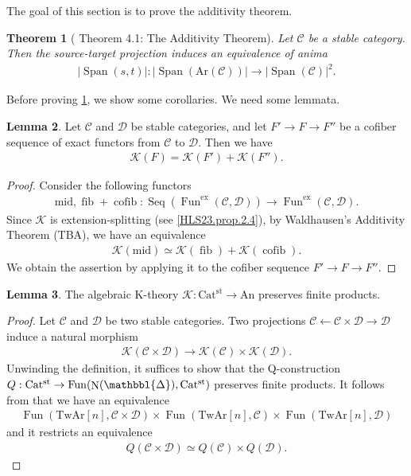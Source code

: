 \documentclass[a4paper,dvipdfmx,11pt,reqno]{amsart}
\DeclareMathOperator{\fib}{fib}
\DeclareMathOperator{\cofib}{cofib}
\renewcommand{\mid}{\mathrm{mid}}
\DeclareMathOperator{\N}{N}
\DeclareMathOperator{\Fun}{Fun}
\newcommand{\C}{\mathcal{C}}
\newcommand{\D}{\mathcal{D}}
\newcommand{\K}{\mathcal{K}}
\DeclareMathOperator{\Seq}{Seq}
\DeclareMathOperator{\Span}{Span}
\newcommand{\An}{\mathrm{An}}
\newcommand{\Catst}{\mathrm{Cat^{st}}}
\newcommand{\Ar}{\mathrm{Ar}}
\newcommand{\TwAr}{\mathrm{TwAr}}
\newcommand{\prism}{{\mathlarger{\mathbbl{\Delta}}}}
\newtheorem{theorem}{Theorem}[section]
\theoremstyle{definition}
\newtheorem{lemma}[theorem]{Lemma}
\begin{document}
The goal of this section is to prove the additivity theorem.

\begin{theorem}[\cite{HLS23} Theorem 4.1: The Additivity Theorem] \label{thrm.additivity_theorem}
  Let $\C$ be a stable category.
  Then the source-target projection induces an equivalence of anima 
  \begin{align*}
    |\Span(s,t)| : |\Span(\Ar(\C))| \to |\Span(\C)|^2.
  \end{align*}
\end{theorem}

Before proving \cref{thrm.additivity_theorem}, we show some corollaries.
We need some lemmata.

\begin{lemma} \label{Ber.cor.5.7}
  Let $\C$ and $\D$ be stable categories, and let $F' \to F \to F''$ be a cofiber sequence of exact functors from $\C$ to $\D$.
  Then we have 
  \begin{align*}
    \K(F) 
    = \K(F') + \K(F'').
  \end{align*}
\end{lemma}

\begin{proof}
  Consider the following functors 
  \begin{align*}
    \mid, \fib+\cofib : \Seq(\Fun^{\mathrm{ex}}(\C,\D)) \to \Fun^{\mathrm{ex}}(\C,\D).
  \end{align*}
  Since $\K$ is extension-splitting (see \cref{HLS23.prop.2.4}), by Waldhausen's Additivity Theorem (TBA), we have an equivalence %
  \begin{align*}
    \K(\mid) 
    \simeq \K(\fib) + \K(\cofib).
  \end{align*}
  We obtain the assertion by applying it to the cofiber sequence $F' \to F \to F''$.
\end{proof}

\begin{lemma} \label{Ber.5.2.2}
  The algebraic K-theory $\K : \Catst \to \An$ preserves finite products.
\end{lemma}

\begin{proof}
  Let $\C$ and $\D$ be two stable categories.
  Two projections $\C \leftarrow \C \times \D \to \D$ induce a natural morphism
  \begin{align*}
    \K(\C \times \D) \to \K(\C) \times \K(\D).
  \end{align*}
  Unwinding the definition, it suffices to show that the Q-construction $Q : \Catst \to \Fun(\N(\prism),\Catst)$ preserves finite products.
  It follows from that we have an equivalence 
  \begin{align*}
    \Fun(\TwAr[n],\C \times \D) \times \Fun(\TwAr[n],\C) \times \Fun(\TwAr[n],\D)
  \end{align*}
  and it restricts an equivalence 
  \begin{align*}
    Q(\C \times \D) 
    \simeq Q(\C) \times Q(\D).
  \end{align*}
\end{proof}
\end{document}
